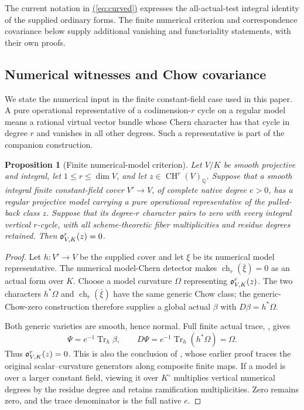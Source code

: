 \documentclass[11pt,a4paper]{article}
\newtheorem{proposition}[theorem]{Proposition}
\theoremstyle{definition}
\theoremstyle{remark}\newtheorem{remark}[theorem]{Remark}
\numberwithin{equation}{section}
\newcommand{\Q}{\mathbb Q}\newcommand{\R}{\mathbb R}\newcommand{\C}{\mathbb C}
\newcommand{\CH}{\operatorname{CH}}\newcommand{\an}{\mathrm{an}}
\newcommand{\Tr}{\operatorname{Tr}}\newcommand{\ch}{\operatorname{ch}}
\renewcommand{\eqref}[1]{\hyperref[#1]{\textcolor{equationlink}{(\ref*{#1})}}}
\begin{document}
The current notation in \eqref{eq:curved} expresses the all-actual-test
integral identity of the supplied ordinary forms. The finite numerical
criterion and correspondence covariance below supply additional
vanishing and functoriality statements, with their own proofs.

\subsection{Numerical witnesses and Chow covariance}\label{sub:covariance}

We state the numerical input in the finite constant-field case used in
this paper. A pure operational representative of a codimension-$r$
cycle on a regular model means a rational virtual vector bundle whose
Chern character has that cycle in degree $r$ and vanishes in all other
degrees. Such a representative is part of the companion construction.

\begin{proposition}[Finite numerical-model criterion]\label{prop:numerical}
Let $V/K$ be smooth projective and integral, let $1\le r\le\dim V$,
and let $z\in\CH^r(V)_\Q$. Suppose that a smooth integral finite
constant-field cover $V'\to V$, of complete native degree $e>0$, has a
regular projective model carrying a pure operational representative of
the pulled-back class $z$. Suppose that its degree-$r$ character pairs
to zero with every integral vertical $r$-cycle, with all
scheme-theoretic fiber multiplicities and residue degrees retained.
Then $\mathfrak o^r_{V,K}(z)=0$.
\end{proposition}
\begin{proof}
Let $h:V'\to V$ be the supplied cover and let $\xi$ be its numerical
model representative. The numerical model-Chern detector makes
$\operatorname{ch}_r(\bar\xi)=0$ as an actual form over $K$.
Choose a model curvature $\Omega$ representing $\mathfrak o^r_{V,K}(z)$.
The two characters $h^*\Omega$ and $\operatorname{ch}_r(\bar\xi)$
have the same generic Chow class; the generic-Chow-zero construction
therefore supplies a global actual $\beta$ with $D\beta=h^*\Omega$.

Both generic varieties are smooth, hence normal. Full finite actual
trace, \cite[\texttt{r16ft:full-trace}]{InternalCovariance}, gives
\[
 \Psi=e^{-1}\Tr_h\beta,\qquad
 D\Psi=e^{-1}\Tr_h(h^*\Omega)=\Omega.
\]
Thus $\mathfrak o^r_{V,K}(z)=0$. This is also the conclusion of
\cite[\texttt{r12a:finite-numerical-cover}]{InternalNumerical},
whose earlier proof traces the original scalar--curvature generators
along composite finite maps. If a model is over a larger constant
field, viewing it over $K^\circ$ multiplies vertical numerical degrees
by the residue degree and retains ramification multiplicities.
Zero remains zero, and the trace denominator is the full native $e$.
\end{proof}
\end{document}
